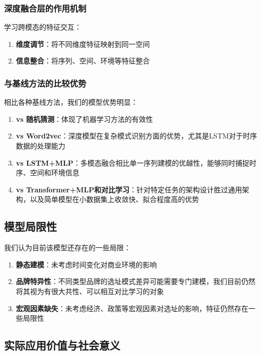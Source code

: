 \documentclass{article}
\begin{document}
\subsubsection{深度融合层的作用机制}

学习跨模态的特征交互：

\begin{enumerate}
\item \textbf{维度调节}：将不同维度特征映射到同一空间
\item \textbf{信息整合}：将序列、空间、环境等特征整合
\end{enumerate}

\subsubsection{与基线方法的比较优势}

相比各种基线方法，我们的模型优势明显：

\begin{enumerate}
\item \textbf{vs 随机猜测}：体现了机器学习方法的有效性
\item \textbf{vs Word2vec}：深度模型在复杂模式识别方面的优势，尤其是LSTM对于时序数据的处理能力
\item \textbf{vs LSTM+MLP}：多模态融合相比单一序列建模的优越性，能够同时捕捉时序、空间和环境信息
\item \textbf{vs Transformer+MLP和对比学习}：针对特定任务的架构设计胜过通用架构，以及简单模型在小数据集上收敛快、拟合程度高的优势
\end{enumerate}

\subsection{模型局限性}

我们认为目前该模型还存在的一些局限：

\begin{enumerate}
\item \textbf{静态建模}：未考虑时间变化对商业环境的影响
\item \textbf{品牌特异性}：不同类型品牌的选址模式差异可能需要专门建模，我们目前仍然将其视为有很大共性、可以相互对比学习的对象
\item \textbf{宏观因素缺失}：未考虑经济、政策等宏观因素对选址的影响，特征仍然存在一些局限性
\end{enumerate}

\subsection{实际应用价值与社会意义}
\end{document}
